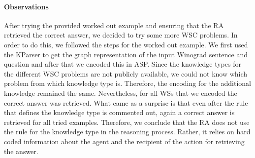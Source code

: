 \paragraph{Observations}
After trying the provided worked out example and ensuring that the RA retrieved the correct answer, we decided to try some more WSC problems. %
In order to do this, we followed the steps for the worked out example. We first used the KParser to get the graph representation of the input Winograd sentence and question and after that we encoded this in ASP.
Since the knowledge types for the different WSC problems are not publicly available, we could not know which problem from which knowledge type is. Therefore, the encoding for the additional knowledge remained the same. 
Nevertheless, for all WSs that we encoded the correct answer was retrieved. 
What came as a surprise is that even after the rule that defines the knowledge type is commented out, again a correct answer is retrieved for all tried examples. Therefore, we conclude that the RA does not use the rule for the knowledge type in the reasoning process. Rather, it relies on hard coded information about the agent and the recipient of the action for retrieving the answer. 

